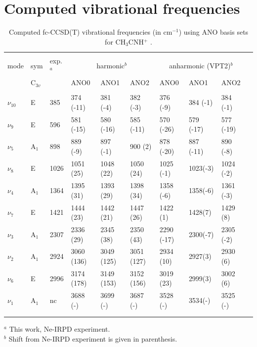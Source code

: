\documentclass[preprint,12pt]{elsarticle}
\newcommand{\wn}{cm$^{-1}$}
\newcommand{\pa}{CH$_3$CNH$^+$ }
\begin{document}
\section*{Computed vibrational frequencies}

\begin{center}
\begin{table}[h]
\caption{Computed fc-CCSD(T) vibrational frequencies (in \wn) using ANO basis sets for \pa. }

    \begin{tabular}{llllllllll} \hline\hline\\
            mode        & sym      & exp.$^a$ & \multicolumn{3}{c}{harmonic$^b$}  & \multicolumn{3}{c}{anharmonic (VPT2)$^b$} \\
                        & C$_{3v}$ &      & ANO0        & ANO1       & ANO2       & ANO0        & ANO1      & ANO2 &          \\\hline\\
            $\nu_{10}$  & E	       & 385  & 374 (-11)	& 381  (-4)  & 382  (-3)  & 376  (-9)   & 384 (-1)  & 384  (-1)       \\
            $\nu_9$     & E	       & 596  & 581 (-15)	& 580  (-16) & 585  (-11) & 570  (-26)  & 579 (-17) & 577  (-19)      \\
            $\nu_5$     & A$_1$	   & 898  & 889 (-9)	& 897  (-1)  & 900  (2)   & 878  (-20)  & 887 (-11) & 890  (-8)       \\
            $\nu_8$     & E	       & 1026 & 1051 (25)	& 1048 (22)  & 1050 (24)  & 1025 (-1)   & 1023(-3)  & 1024 (-2)       \\
            $\nu_4$     & A$_1$	   & 1364 & 1395 (31)	& 1393 (29)  & 1398 (34)  & 1358 (-6)   & 1358(-6)  & 1361 (-3)       \\
            $\nu_7$     & E	       & 1421 & 1444 (23)	& 1442 (21)  & 1447 (26)  & 1422 (1)    & 1428(7)   & 1429 (8)        \\
            $\nu_3$     & A$_1$	   & 2307 & 2336 (29)	& 2345 (38)  & 2350 (43)  & 2290 (-17)  & 2300(-7)  & 2305 (-2)       \\
            $\nu_2$     & A$_1$	   & 2924 & 3060 (136)	& 3049 (125) & 3051 (127) & 2934 (10)   & 2927(3)   & 2930 (6)        \\
            $\nu_6$     & E	       & 2996 & 3174 (178)	& 3149 (153) & 3152 (156) & 3019 (23)   & 2999(3)   & 3002 (6)        \\
            $\nu_1$     & A$_1$	   & nc   & 3688 (-)	& 3699 (-)	 & 3687 (-)   & 3528 (-)    & 3534(-)   & 3525 (-)        \\
        \\
        \hline\hline\\
    \end{tabular}
    
    $^a$ This work, Ne-IRPD experiment.\\
    $^b$ Shift from Ne-IRPD experiment is given in parenthesis.
\end{table}
\end{center}
\restoregeometry
\end{document}
